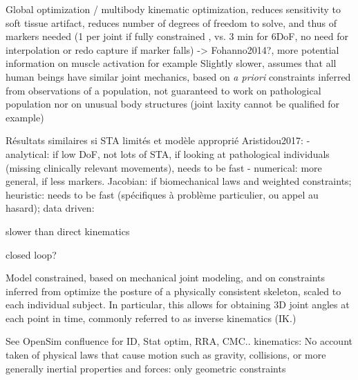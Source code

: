 Global optimization / multibody kinematic optimization, reduces sensitivity to soft tissue artifact, reduces number of degrees of freedom to solve, and thus of markers needed (1 per joint if fully constrained \cite{Slater2018}, vs. 3 min for 6DoF, no need for interpolation or redo capture if marker falls) -> Fohanno2014?, more potential information on muscle activation for example \cite{Robinson2013,Kainz2016}
Slightly slower, assumes that all human beings have similar joint mechanics, based on \textit{a priori} constraints inferred from observations of a population, not guaranteed to work on pathological population nor on unusual body structures (joint laxity cannot be qualified for example)

Résultats similaires si STA limités et modèle approprié \cite{Kainz2016}
Aristidou2017: 
- analytical: if low DoF, not lots of STA, if looking at pathological individuals (missing  clinically relevant movements), needs to be fast
- numerical: more general, if less markers. Jacobian: if biomechanical laws and weighted constraints; heuristic: needs to be fast (spécifiques à problème particulier, ou appel au hasard); data driven:

slower than direct kinematics



closed loop?



Model constrained, based on mechanical joint modeling, and on constraints inferred from  
optimize the posture of a physically consistent skeleton, scaled to each individual subject. In particular, this allows for obtaining 3D joint angles at each point in time, commonly referred to as inverse kinematics (IK.)







See OpenSim confluence for ID, Stat optim, RRA, CMC..
kinematics: No account taken of physical laws that cause motion such as gravity, collisions, or more generally inertial properties and forces: only geometric constraints










